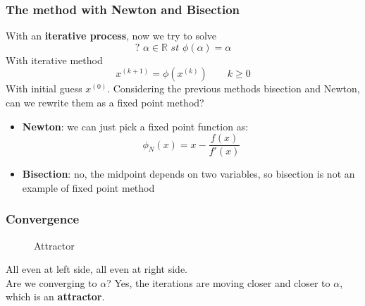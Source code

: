 \subsubsection{The method with Newton and Bisection}
With an \textbf{iterative process}, now we try to solve
$$?\,\,\alpha\in\mathbb{R}\,\,st\,\,\phi(\alpha)=\alpha$$
With iterative method
$$x^{(k+1)}=\phi(x^{(k)})\qquad k\geq 0$$
With initial guess $x^{(0)}$. Considering the previous methods bisection and Newton, can we rewrite them as a fixed point method?
\begin{itemize}
    \item \textbf{Newton}: we can just pick a fixed point function as:
    $$\phi_N(x)=x-\frac{f(x)}{f'(x)}$$
    \item \textbf{Bisection}: no, the midpoint depends on two variables, so bisection is not an example of fixed point method
\end{itemize}

\pagebreak
\subsubsection{Convergence}
\begin{figure}[!ht]
    \begin{minipage}{\linewidth}
        \centering
        \caption{Attractor}
    \end{minipage}
\end{figure}

All even at left side, all even at right side.\\
Are we converging to $\alpha$? Yes, the iterations are moving closer and closer to $\alpha$, which is an \textbf{attractor}.

